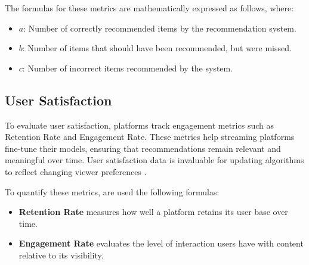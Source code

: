 \documentclass[12pt, english, a4paper]{article}
\begin{document}
The formulas for these metrics are mathematically expressed as follows, where:
\begin{itemize}
    \item $a$: Number of correctly recommended items by the recommendation system.
    \item $b$: Number of items that should have been recommended, but were missed.
    \item $c$: Number of incorrect items recommended by the system.
\end{itemize}

\clearpage

\subsection{User Satisfaction}

\hspace*{2em}To evaluate user satisfaction, platforms track engagement metrics such as Retention Rate and Engagement Rate. These metrics help streaming platforms fine-tune their models, ensuring that recommendations remain relevant and meaningful over time. User satisfaction data is invaluable for updating algorithms to reflect changing viewer preferences \cite{Souane2023}.

To quantify these metrics, are used the following formulas:
\begin{itemize}
    \item \textbf{Retention Rate} measures how well a platform retains its user base over time.
    \item \textbf{Engagement Rate} evaluates the level of interaction users have with content relative to its visibility.
\end{itemize}

\begin{table}[ht]
\centering
\renewcommand{\arraystretch}{3} %
\setlength{\tabcolsep}{20pt} %
\caption{Formulas of Retention Rate and Engagement Rate}
\label{tab:retention-engagement}
\end{table}
\end{document}
